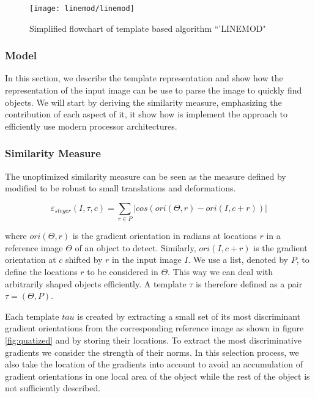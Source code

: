 \begin{figure}[ht]
\centering
\texttt{[image: linemod/linemod]}
\caption{Simplified flowchart of template based algorithm ``'LINEMOD" \citet{Hinterstoisser2011}}
\label{fig:clutter}
\end{figure}

\subsubsection{Model}
In this section, we describe the template representation and show how the representation 
of the input image can be use to parse the image to quickly find objects.
We will start by deriving the similarity measure, emphasizing the contribution of each 
aspect of it, it show how is implement the approach to
efficiently use modern processor architectures.

\subsubsection{Similarity Measure}
The unoptimized similarity measure can be seen as the measure defined by \citet{Steger2002} 
modified to be robust to small translations and deformations. 

\begin{equation}
\label{eq:similarity}
\varepsilon_{steger}(I, \tau, c) = \sum_{r \in P}\left| cos(ori(\Theta,r) - ori(I,c+r))\right|
\end{equation}

where $ori(\Theta,r)$ is the gradient orientation in radians at locations $r$ in a 
reference image $\Theta$ of an object to detect. Similarly, $ori(I,c+r)$ is the 
gradient orientation at $c$ shifted by $r$ in the input image $I$. We use a list,
denoted by $P$, to define the locations $r$ to be considered in $\Theta$. This way we
can deal with arbitrarily shaped objects efficiently. A template $\tau$ is therefore
defined as a pair $\tau=(\Theta,P)$.

Each template $tau$ is created by extracting a small set of its most discriminant
gradient orientations from the corresponding reference image as shown in figure \ref{fig:quatized}
and by storing their locations. To extract the most discriminative gradients we consider
the strength of their norms. In this selection process, we also take the location
of the gradients into account to avoid an accumulation of gradient orientations in
one local area of the object while the rest of the object is not sufficiently described.


